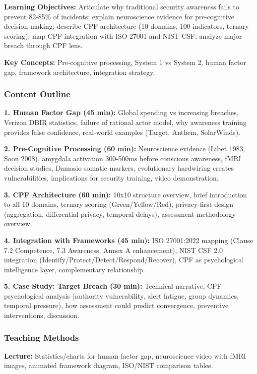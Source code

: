 \documentclass[11pt,a4paper]{article}
\begin{document}
\textbf{Learning Objectives:} Articulate why traditional security awareness fails to prevent 82-85\% of incidents; explain neuroscience evidence for pre-cognitive decision-making; describe CPF architecture (10 domains, 100 indicators, ternary scoring); map CPF integration with ISO 27001 and NIST CSF; analyze major breach through CPF lens.

\textbf{Key Concepts:} Pre-cognitive processing, System 1 vs System 2, human factor gap, framework architecture, integration strategy.

\subsubsection{Content Outline}
\textbf{1. Human Factor Gap (45 min):} Global spending vs increasing breaches, Verizon DBIR statistics, failure of rational actor model, why awareness training provides false confidence, real-world examples (Target, Anthem, SolarWinds).

\textbf{2. Pre-Cognitive Processing (60 min):} Neuroscience evidence (Libet 1983, Soon 2008), amygdala activation 300-500ms before conscious awareness, fMRI decision studies, Damasio somatic markers, evolutionary hardwiring creates vulnerabilities, implications for security training, video demonstration.

\textbf{3. CPF Architecture (60 min):} 10x10 structure overview, brief introduction to all 10 domains, ternary scoring (Green/Yellow/Red), privacy-first design (aggregation, differential privacy, temporal delays), assessment methodology overview.

\textbf{4. Integration with Frameworks (45 min):} ISO 27001:2022 mapping (Clause 7.2 Competence, 7.3 Awareness, Annex A enhancement), NIST CSF 2.0 integration (Identify/Protect/Detect/Respond/Recover), CPF as psychological intelligence layer, complementary relationship.

\textbf{5. Case Study: Target Breach (30 min):} Technical narrative, CPF psychological analysis (authority vulnerability, alert fatigue, group dynamics, temporal pressure), how assessment could predict convergence, preventive interventions, discussion.

\subsubsection{Teaching Methods}
\textbf{Lecture:} Statistics/charts for human factor gap, neuroscience video with fMRI images, animated framework diagram, ISO/NIST comparison tables.
\end{document}
